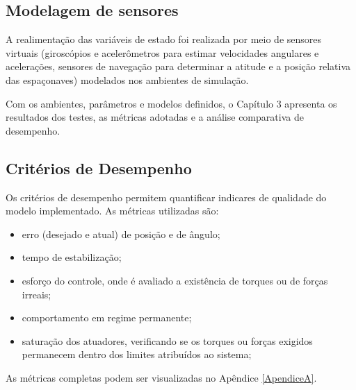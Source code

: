\subsection{Modelagem de sensores}
A realimentação das variáveis de estado foi realizada por meio de sensores virtuais (giroscópios e acelerômetros para estimar velocidades angulares e acelerações, sensores de navegação para determinar a atitude e a posição relativa das espaçonaves) modelados nos ambientes de simulação. 

Com os ambientes, parâmetros e modelos definidos, o Capítulo 3 apresenta os resultados dos testes, as métricas adotadas e a análise comparativa de desempenho.

\subsection{Critérios de Desempenho}
\label{sec:criterios_desempenho}

Os critérios de desempenho permitem quantificar indicares de qualidade do modelo implementado. As métricas utilizadas são:
\begin{itemize}
  \item erro (desejado e atual) de posição e de ângulo;
  \item tempo de estabilização;
  \item esforço do controle, onde é avaliado a existência de torques ou de forças irreais;
  \item comportamento em regime permanente;
  \item saturação dos atuadores, verificando se os torques ou forças exigidos permanecem dentro dos limites atribuídos ao sistema;
\end{itemize}

As métricas completas podem ser visualizadas no Apêndice \eqref{ApendiceA}.




% 
% 
% 
% 



